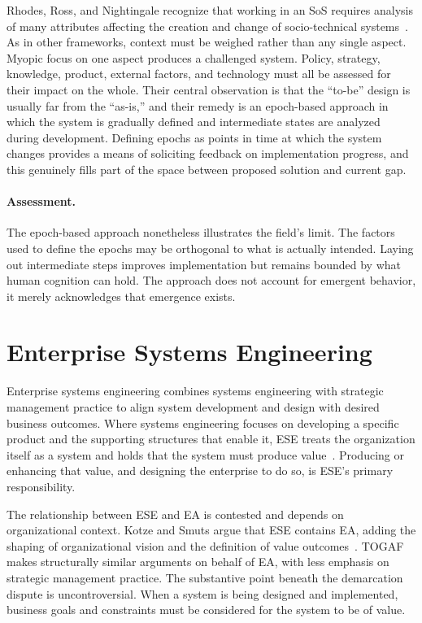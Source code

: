 \documentclass{csimq}
\begin{document}
Rhodes, Ross, and Nightingale recognize that working in an SoS requires analysis
of many attributes affecting the creation and change of socio-technical
systems~\cite{rhodes2009}. As in other frameworks, context must be weighed
rather than any single aspect. Myopic focus on one aspect produces a challenged
system. Policy, strategy, knowledge, product, external factors, and technology
must all be assessed for their impact on the whole. Their central observation is
that the ``to-be'' design is usually far from the ``as-is,'' and their remedy is
an epoch-based approach in which the system is gradually defined and
intermediate states are analyzed during development. Defining epochs as points
in time at which the system changes provides a means of soliciting feedback on
implementation progress, and this genuinely fills part of the space between
proposed solution and current gap.

\paragraph{Assessment.} The epoch-based approach nonetheless illustrates the
field's limit. The factors used to define the epochs may be orthogonal to
what is actually intended. Laying out intermediate steps improves implementation
but remains bounded by what human cognition can hold. The approach does not
account for emergent behavior, it merely acknowledges that emergence exists.

\section{Enterprise Systems Engineering}
\label{sec:ese}

Enterprise systems engineering combines systems engineering with
strategic management practice to align system development and design with
desired business outcomes. Where systems engineering focuses on developing a
specific product and the supporting structures that enable it, ESE treats the
organization itself as a system and holds that the system must produce
value~\cite{kotze2016}. Producing or enhancing that value, and designing the
enterprise to do so, is ESE's primary responsibility.

The relationship between ESE and EA is contested and depends on organizational
context. Kotze and Smuts argue that ESE contains EA, adding the shaping
of organizational vision and the definition of value outcomes~\cite{kotze2016}.
TOGAF makes structurally similar arguments on behalf of EA, with less emphasis
on strategic management practice. The substantive point beneath the demarcation
dispute is uncontroversial. When a system is being designed and implemented,
business goals and constraints must be considered for the system to be of value.
\end{document}
